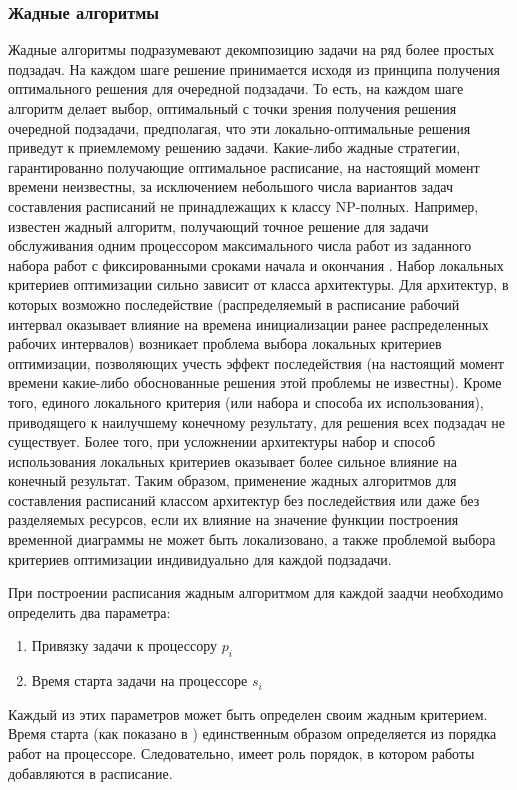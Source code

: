 \subsubsection{Жадные алгоритмы}
Жадные алгоритмы подразумевают декомпозицию задачи на ряд более простых подзадач. На каждом шаге решение принимается исходя из принципа получения оптимального решения для очередной подзадачи. То есть, на каждом шаге алгоритм делает выбор, оптимальный с точки зрения получения решения очередной подзадачи, предполагая, что эти локально-оптимальные решения приведут к приемлемому решению задачи. Какие-либо жадные стратегии, гарантированно получающие оптимальное расписание, на настоящий момент времени неизвестны, за исключением небольшого числа вариантов задач составления расписаний не принадлежащих к классу NP-полных. Например, известен жадный алгоритм, получающий точное решение для задачи обслуживания одним процессором максимального числа работ из заданного набора работ с фиксированными сроками начала и окончания \cite{Cormen}. Набор локальных критериев оптимизации сильно зависит от класса архитектуры. Для архитектур, в которых возможно последействие (распределяемый в расписание рабочий интервал оказывает влияние на времена инициализации ранее распределенных рабочих интервалов) возникает проблема выбора локальных критериев оптимизации, позволяющих учесть эффект последействия (на настоящий момент времени какие-либо обоснованные решения этой проблемы не известны). Кроме того, единого локального критерия (или набора и способа их использования), приводящего к наилучшему конечному результату, для решения всех подзадач не существует. Более того, при усложнении архитектуры набор и способ использования локальных критериев оказывает более сильное влияние на конечный результат. Таким образом, применение жадных алгоритмов для составления расписаний классом архитектур без последействия или даже без разделяемых ресурсов, если их влияние на значение функции построения временной диаграммы не может быть локализовано, а также проблемой выбора критериев оптимизации индивидуально для каждой подзадачи.

При построении расписания жадным алгоритмом для каждой заадчи необходимо определить два параметра:
\begin{enumerate}
    \item Привязку задачи к процессору $p_i$
    \item Время старта задачи на процессоре $s_i$
\end{enumerate}
Каждый из этих параметров может быть определен своим жадным критерием. Время старта (как показано в \cite{Kalashnikov_2004}) единственным образом определяется из порядка работ на процессоре. Следовательно, имеет роль порядок, в котором работы добавляются в расписание.

